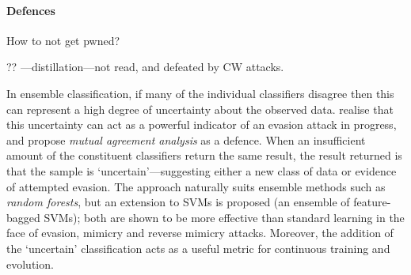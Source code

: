 %

\paragraph{Defences}
How to not get pwned?

?? \textcite{DBLP:conf/sp/PapernotM0JS16}---distillation---not read, and defeated by CW attacks.

In ensemble classification, if many of the individual classifiers disagree then this can represent a high degree of uncertainty about the observed data.
\textcite{DBLP:conf/ndss/SmutzS16} realise that this uncertainty can act as a powerful indicator of an evasion attack in progress, and propose \emph{mutual agreement analysis} as a defence.
When an insufficient amount of the constituent classifiers return the same result, the result returned is that the sample is `uncertain'---suggesting either a new class of data or evidence of attempted evasion.
The approach naturally suits ensemble methods such as \emph{random forests}, but an extension to SVMs is proposed (an ensemble of feature-bagged SVMs); both are shown to be more effective than standard learning in the face of evasion, mimicry and reverse mimicry attacks.
Moreover, the addition of the `uncertain' classification acts as a useful metric for continuous training and evolution.

